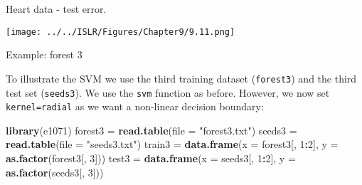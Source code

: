 \documentclass[10pt,ignorenonframetext,]{beamer}
\newenvironment{Shaded}{\begin{snugshade}}{\end{snugshade}}
\newcommand{\DataTypeTok}[1]{\textcolor[rgb]{0.13,0.29,0.53}{#1}}
\newcommand{\DecValTok}[1]{\textcolor[rgb]{0.00,0.00,0.81}{#1}}
\newcommand{\KeywordTok}[1]{\textcolor[rgb]{0.13,0.29,0.53}{\textbf{#1}}}
\newcommand{\NormalTok}[1]{#1}
\newcommand{\OperatorTok}[1]{\textcolor[rgb]{0.81,0.36,0.00}{\textbf{#1}}}
\newcommand{\StringTok}[1]{\textcolor[rgb]{0.31,0.60,0.02}{#1}}
\begin{document}
\begin{frame}

Heart data - test error.

\centering

\texttt{[image: ../../ISLR/Figures/Chapter9/9.11.png]}

\end{frame}

\begin{frame}[fragile]

\begin{block}{Example: forest 3}

\vspace{2mm}

To illustrate the SVM we use the third training dataset
(\texttt{forest3}) and the third test set (\texttt{seeds3}). We use the
\texttt{svm} function as before. However, we now set
\texttt{kernel=\textquotesingle{}radial\textquotesingle{}} as we want a
non-linear decision boundary:

\footnotesize

\begin{Shaded}
\begin{Highlighting}[]
\KeywordTok{library}\NormalTok{(e1071)}
\NormalTok{forest3 =}\StringTok{ }\KeywordTok{read.table}\NormalTok{(}\DataTypeTok{file =} \StringTok{"forest3.txt"}\NormalTok{)}
\NormalTok{seeds3 =}\StringTok{ }\KeywordTok{read.table}\NormalTok{(}\DataTypeTok{file =} \StringTok{"seeds3.txt"}\NormalTok{)}
\NormalTok{train3 =}\StringTok{ }\KeywordTok{data.frame}\NormalTok{(}\DataTypeTok{x =}\NormalTok{ forest3[, }\DecValTok{1}\OperatorTok{:}\DecValTok{2}\NormalTok{], }\DataTypeTok{y =} \KeywordTok{as.factor}\NormalTok{(forest3[, }\DecValTok{3}\NormalTok{]))}
\NormalTok{test3 =}\StringTok{ }\KeywordTok{data.frame}\NormalTok{(}\DataTypeTok{x =}\NormalTok{ seeds3[, }\DecValTok{1}\OperatorTok{:}\DecValTok{2}\NormalTok{], }\DataTypeTok{y =} \KeywordTok{as.factor}\NormalTok{(seeds3[, }\DecValTok{3}\NormalTok{]))}
\end{Highlighting}
\end{Shaded}

\end{block}

\end{frame}
\end{document}
